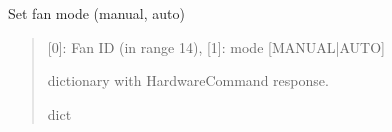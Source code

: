 \documentclass[letterpaper,10pt,english]{sphinxmanual}
\begin{document}
\begin{fulllineitems}
\label{\detokenize{webserverdocs:subrack_hardware.SetFanMode}}
\pysigstartsignatures
{}
\pysigstopsignatures
\sphinxAtStartPar
Set fan mode (manual, auto)

\begin{fulllineitems}
\label{\detokenize{webserverdocs:subrack_hardware.SetFanMode.do}}
\pysigstartsignatures
{}
\pysigstopsignatures\begin{quote}\begin{description}
\sphinxAtStartPar
{} \textendash{} {[}0{]}: Fan ID (in range 1\sphinxhyphen{}4), {[}1{]}: mode {[}MANUAL|AUTO{]}

\sphinxAtStartPar
dictionary with HardwareCommand response.

\sphinxAtStartPar
dict

\end{description}\end{quote}

\end{fulllineitems}


\end{fulllineitems}

\end{document}
